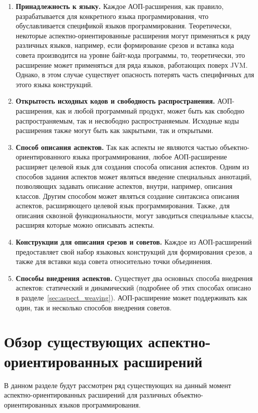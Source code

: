 \begin{enumerate}
\item \textbf{Принадлежность к языку.}
  Каждое АОП-расширения, как правило, разрабатывается для конкретного языка
  программирования, что обуславливается спецификой языков программирования.
  Теоретически, некоторые аспектно-ориентированные расширения могут применяться
  к ряду различных языков, например, если формирование срезов и вставка кода
  совета производится на уровне байт-кода программы, то, теоретически, это
  расширение может применяться для ряда языков, работающих поверх JVM.
  Однако, в этом случае существует опасность потерять часть специфичных для
  этого языка конструкций.
\item \textbf{Открытость исходных кодов и свободность распространения.}
  АОП-расширения, как и любой программный продукт, может быть как свободно
  распространяемым, так и несвободно распространяемым.
  Исходные коды расширения также могут быть как закрытыми, так и открытыми.
\item \textbf{Способ описания аспектов.}
  Так как аспекты не являются частью объектно-ориентированного языка
  программирования, любое АОП-расширение расширяет целевой язык для создания
  способа описания аспектов.
  Одним из способов задания аспектов может являться введение специальных
  аннотаций, позволяющих задавать описание аспектов, внутри, например, описания
  классов.
  Другим способом может являться создание синтаксиса описания аспектов,
  расширяющего целевой язык программирования.
  Также, для описания сквозной функциональности, могут заводиться специальные
  классы, расширяя которые можно описывать аспекты.
\item \textbf{Конструкции для описания срезов и советов.}
  Каждое из АОП-расширений предоставляет свой набор языковых конструкций для
  формирования срезов, а также для вставки кода совета относительно точки
  объединения.
\item \textbf{Способы внедрения аспектов.}
  Существует два основных способа внедрения аспектов: статический и динамический
  (подробнее об этих способах описано в разделе~\ref{sec:aspect_weaving}).
  АОП-расширение может поддерживать как один, так и несколько способов внедрения
  советов.
\end{enumerate}
\section{Обзор существующих аспектно-ориентированных расширений}
В данном разделе будут рассмотрен ряд существующих на данный момент
аспектно-ориентированных расширений для различных объектно-ориентированных
языков программирования.
